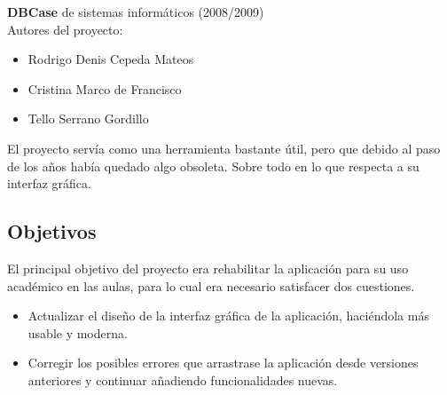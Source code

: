 \textbf{DBCase} de sistemas informáticos (2008/2009)\\
Autores del proyecto:
\begin{itemize}
    \item Rodrigo Denis Cepeda Mateos
    \item Cristina Marco de Francisco
    \item Tello Serrano Gordillo
\end{itemize}
El proyecto servía como una herramienta bastante útil, pero que debido al paso de los años había quedado algo obsoleta. Sobre todo en lo que respecta a su interfaz gráfica.
\subsection{Objetivos}
El principal objetivo del proyecto era rehabilitar la aplicación para su uso académico en las aulas, para lo cual era necesario satisfacer dos cuestiones.
\begin{itemize}
    \item Actualizar el diseño de la interfaz gráfica de la aplicación, haciéndola más usable y moderna.
    \item Corregir los posibles errores que arrastrase la aplicación desde versiones anteriores y continuar añadiendo funcionalidades nuevas.
\end{itemize}
